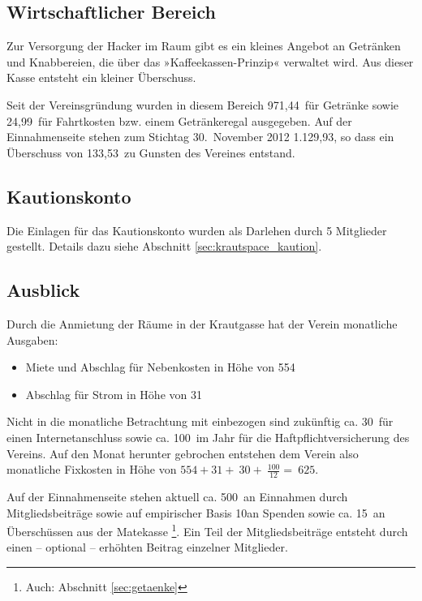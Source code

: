 \documentclass[10pt,DIV16]{scrartcl}
\begin{document}
\subsection{Wirtschaftlicher Bereich}

Zur Versorgung der Hacker im Raum gibt es ein kleines Angebot an 
Getränken und Knabbereien, die über das »Kaffeekassen-Prinzip« 
verwaltet wird. Aus dieser Kasse entsteht ein kleiner Überschuss. 

Seit der Vereinsgründung wurden in diesem Bereich 971,44\EUR\ für 
Getränke sowie 24,99\EUR\ für Fahrtkosten bzw. einem Getränkeregal 
ausgegeben. Auf der Einnahmenseite stehen zum Stichtag 30.~November 
2012 1.129,93\EUR, so dass ein Überschuss von 133,53\EUR\ zu Gunsten 
des Vereines entstand. 

\subsection{Kautionskonto}

Die Einlagen für das Kautionskonto wurden als Darlehen durch 5 
Mitglieder gestellt. Details dazu siehe Abschnitt 
\ref{sec:krautspace_kaution}.

\subsection{Ausblick} 

Durch die Anmietung der Räume in der Krautgasse hat der Verein 
monatliche Ausgaben: 

\begin{itemize}
	\item Miete und Abschlag für Nebenkosten in Höhe von 554\EUR{}
	\item Abschlag für Strom in Höhe von 31\EUR{}
\end{itemize}

Nicht in die monatliche Betrachtung mit einbezogen sind zukünftig 
ca. 30\EUR\ für einen Internetanschluss sowie ca. 100\EUR\ im Jahr 
für die Haftpflichtversicherung des Vereins. Auf den Monat herunter 
gebrochen entstehen dem Verein also monatliche Fixkosten in Höhe von 
$554 + 31 + ~30+ ~\frac{100}{12} = ~625$\EUR. 

Auf der Einnahmenseite stehen aktuell ca. 500\EUR\ an Einnahmen 
durch Mitgliedsbeiträge sowie auf empirischer Basis 10\EUR an 
Spenden sowie ca. 15\EUR\ an Überschüssen aus der Matekasse
\footnote{Auch: Abschnitt \ref{sec:getaenke}}. Ein Teil der 
Mitgliedsbeiträge entsteht durch einen -- optional -- erhöhten 
Beitrag einzelner Mitglieder. 
\end{document}
